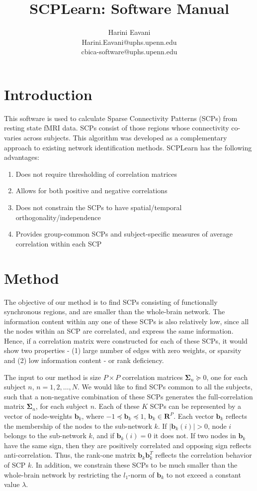 \documentclass[12pt]{article}
\newcommand{\bb}{\mathbf{b}}
\newcommand{\bSigma}{\mathbf{\Sigma}}
\newcommand{\reals}{\mathbb{\mathbf{R}}}
\begin{document}
\title{SCPLearn: Software Manual}
\author{Harini Eavani \\ Harini.Eavani@uphs.upenn.edu \\ cbica-software@uphs.upenn.edu}
\maketitle

\section{Introduction}
This software is used to calculate Sparse Connectivity Patterns (SCPs) from resting state fMRI data. SCPs consist of those regions whose connectivity co-varies across subjects. This algorithm was developed as a complementary approach to existing network identification methods. SCPLearn has the following advantages:
\begin{enumerate}
\item Does not require thresholding of correlation matrices
\item Allows for both positive and negative correlations
\item Does not constrain the SCPs to have spatial/temporal orthogonality/independence
\item Provides group-common SCPs and subject-specific measures of average correlation within each SCP
\end{enumerate}

\section{Method}
 The objective of our method is to find SCPs consisting of functionally synchronous regions, and are smaller than the whole-brain network. The information content within any one of these SCPs is also relatively low, since all the nodes within an SCP are correlated, and express the same information. Hence, if a correlation matrix were constructed for each of these SCPs, it would show two properties - (1) large number of edges with zero weights, or sparsity and (2) low information content - or rank deficiency. 

The input to our method is size $P \times P$ correlation matrices $\bSigma_n \succeq 0 $, one for each subject $n$, $n = 1, 2, \ldots, N$. We would like to find SCPs common to all the subjects, such that a non-negative combination of these SCPs generates the full-correlation matrix  $\bSigma_n$, for each subject $n$. Each of these $K$ SCPs can be represented by a vector of node-weights $\bb_k$, where $ -1 \preceq \bb_k \preceq 1$, $\bb_k \in \reals^P$. Each vector $\bb_k$ reflects the membership of the nodes to the sub-network $k$.  If $\left|\bb_k (i) \right| > 0 $, node $i$ belongs to the sub-network $k$, and if $\bb_k (i) = 0 $ it does not. If two nodes in $\bb_k$ have the same sign, then they are positively correlated and opposing sign reflects anti-correlation. Thus, the rank-one matrix $\bb_k \bb_k^T$ reflects the correlation behavior of SCP $k$. In addition, we constrain these SCPs to be much smaller than the whole-brain network by restricting the $l_1$-norm of $\bb_k$ to not exceed a constant value $\lambda$. 	
\end{document}
